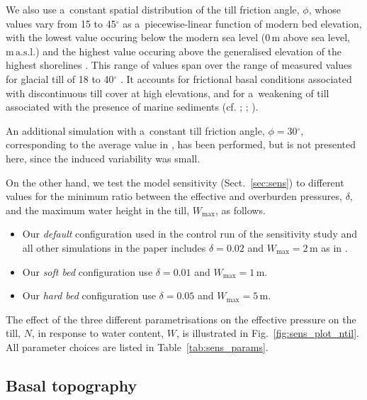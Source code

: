 \documentclass{article}
\newcommand{\unit}[1]{\ensuremath{\mathrm{#1}}}
\newcommand{\degree}[0]{\ensuremath{^{\circ}}}
\begin{document}
      We also use a~constant spatial distribution of the till friction
      angle, $\phi$, whose values vary from 15 to 45\unit{\degree} as
      a~piecewise-linear function of modern bed elevation, with the lowest
      value occuring below the modern sea level (0\,\unit{m} above sea level,
      \unit{m\,a.s.l.}) and the highest value occuring above the generalised
      elevation of the highest shorelines
      \citep[200\,\unit{m\,a.s.l.},][Fig.~5]{Clague.1981}. This range of
      values span over the range of measured values for glacial till of 18
      to 40\unit{\degree} \citep[p.~268]{Cuffey.Paterson.2010}. It accounts
      for frictional basal conditions associated with discontinuous till
      cover at high elevations, and for a~weakening of till associated with
      the presence of marine sediments (cf. \citealp{Martin.etal.2011};
      \citealp[Supplement]{Aschwanden.etal.2013};
      \citealp{PISM-authors.2015}).

      An additional simulation with a~constant till friction angle,
      $\phi=30$\unit{\degree}, corresponding to the average value in
      \citet[p.~268]{Cuffey.Paterson.2010}, has been performed, but is not
      presented here, since the induced variability was small.

      On the other hand, we test the model sensitivity
      (Sect.~\ref{sec:sens}) to different values for the minimum ratio
      between the effective and overburden pressures, $\delta$, and the
      maximum water height in the till, $W_{\text{max}}$, as follows.
%
\begin{itemize}
  \item Our \emph{default} configuration used in the control run of the
    sensitivity study and all other simulations in the paper includes
    $\delta=0.02$ and $W_{\text{max}}=2$\,\unit{m} as in
    \citet{Bueler.Pelt.2015}.
  \item Our \emph{soft bed} configuration use $\delta=0.01$ and
    $W_{\text{max}}=1$\,\unit{m}.
  \item Our \emph{hard bed} configuration use $\delta=0.05$ and
    $W_{\text{max}}=5$\,\unit{m}.
\end{itemize}
%
      The effect of the three different parametrisations on the effective
      pressure on the till, $N$, in response to water content, $W$, is
      illustrated in Fig.~\ref{fig:sens_plot_ntil}. All parameter choices
      are listed in Table~\ref{tab:sens_params}.

\subsection{Basal topography}
\label{sec:bedrock}
\end{document}
